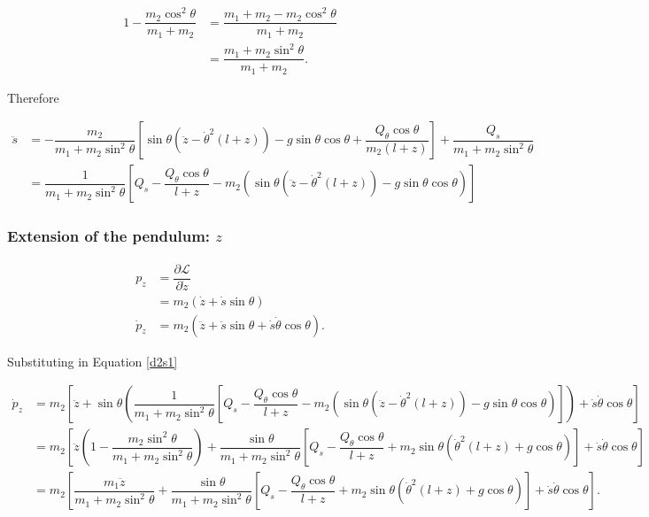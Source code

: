 \documentclass[12pt,a4paper,portrait]{article}
\newcommand{\lag}{\mathcal{L}}
\begin{document}
\begin{align*}
	1-\dfrac{m_2\cos^2{\theta}}{m_1+m_2} &= \dfrac{m_1+m_2 - m_2\cos^2{\theta}}{m_1+m_2} \\
	&= \dfrac{m_1+m_2\sin^2{\theta}}{m_1+m_2}.
\end{align*}

Therefore

\begin{align}
	\ddot{s} &= -\dfrac{m_2}{m_1+m_2\sin^2{\theta}}\left[\sin{\theta}(\ddot{z}-\dot{\theta}^2(l+z)) - g\sin{\theta}\cos{\theta} + \dfrac{Q_{\theta}\cos{\theta}}{m_2(l+z)}\right] + \dfrac{Q_s}{m_1+m_2\sin^2{\theta}} \nonumber\\
	&= \dfrac{1}{m_1+m_2\sin^2{\theta}}\left[Q_s - \dfrac{Q_{\theta}\cos{\theta}}{l+z} - m_2\left(\sin{\theta}(\ddot{z}-\dot{\theta}^2(l+z)) - g\sin{\theta}\cos{\theta}\right)\right] \label{d2s1}
\end{align}

\subsubsection{Extension of the pendulum: $z$}
\begin{align*}
	p_z &= \dfrac{\partial \lag}{\partial \dot{z}} \\
	&= m_2(\dot{z} + \dot{s}\sin{\theta}) \\
	\dot{p}_z &= m_2 (\ddot{z} + \ddot{s}\sin{\theta} + \dot{s}\dot{\theta}\cos{\theta}).
\end{align*}

Substituting in Equation \eqref{d2s1}

\begin{align*}
	\dot{p}_z &= m_2 \left[\ddot{z} + \sin{\theta}\left(\dfrac{1}{m_1+m_2\sin^2{\theta}}\left[Q_s - \dfrac{Q_{\theta}\cos{\theta}}{l+z} - m_2\left(\sin{\theta}(\ddot{z}-\dot{\theta}^2(l+z)) - g\sin{\theta}\cos{\theta}\right)\right]\right) + \dot{s}\dot{\theta}\cos{\theta}\right]\\
	&= m_2 \left[\ddot{z}\left(1-\dfrac{m_2\sin^2{\theta}}{m_1+m_2\sin^2{\theta}}\right) + \dfrac{\sin{\theta}}{m_1+m_2\sin^2{\theta}}\left[Q_s - \dfrac{Q_{\theta}\cos{\theta}}{l+z} + m_2\sin{\theta}\left(\dot{\theta}^2(l+z) + g\cos{\theta}\right)\right] + \dot{s}\dot{\theta}\cos{\theta}\right] \\
	&=m_2 \left[\dfrac{m_1\ddot{z}}{m_1+m_2\sin^2{\theta}} + \dfrac{\sin{\theta}}{m_1+m_2\sin^2{\theta}}\left[Q_s - \dfrac{Q_{\theta}\cos{\theta}}{l+z} + m_2\sin{\theta}\left(\dot{\theta}^2(l+z) + g\cos{\theta}\right)\right] + \dot{s}\dot{\theta}\cos{\theta}\right].
\end{align*}
\end{document}
